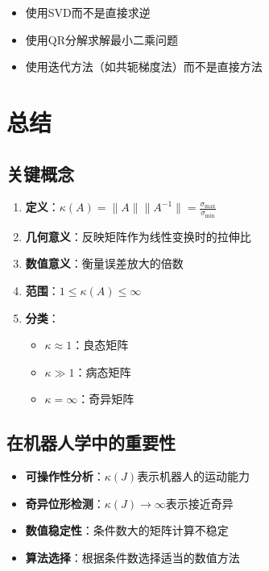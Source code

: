 \documentclass[12pt,a4paper]{article}
\begin{document}
\begin{itemize}
\item 使用SVD而不是直接求逆
\item 使用QR分解求解最小二乘问题
\item 使用迭代方法（如共轭梯度法）而不是直接方法
\end{itemize}

\section{总结}

\subsection{关键概念}

\begin{enumerate}
\item \textbf{定义}：$\kappa(A) = \|A\| \|A^{-1}\| = \frac{\sigma_{\max}}{\sigma_{\min}}$

\item \textbf{几何意义}：反映矩阵作为线性变换时的拉伸比

\item \textbf{数值意义}：衡量误差放大的倍数

\item \textbf{范围}：$1 \leq \kappa(A) \leq \infty$

\item \textbf{分类}：
\begin{itemize}
\item $\kappa \approx 1$：良态矩阵
\item $\kappa \gg 1$：病态矩阵
\item $\kappa = \infty$：奇异矩阵
\end{itemize}
\end{enumerate}

\subsection{在机器人学中的重要性}

\begin{itemize}
\item \textbf{可操作性分析}：$\kappa(J)$表示机器人的运动能力
\item \textbf{奇异位形检测}：$\kappa(J) \to \infty$表示接近奇异
\item \textbf{数值稳定性}：条件数大的矩阵计算不稳定
\item \textbf{算法选择}：根据条件数选择适当的数值方法
\end{itemize}
\end{document}
